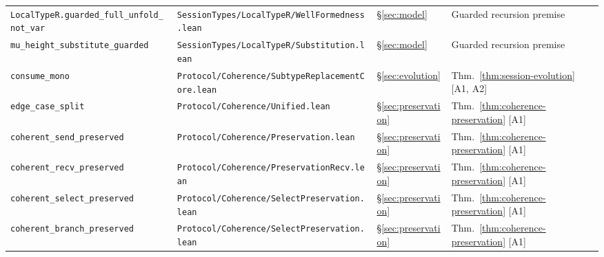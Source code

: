 \documentclass[a4paper,10pt,twocolumn,english]{article}
\numberwithin{equation}{section}
\theoremstyle{paperdef}
\theoremstyle{paperplain}
\theoremstyle{paperdef}
\theoremstyle{paperremark}
\begin{document}
\begin{table}[H]
\begin{tabularx}{\textwidth}{L{0.27\textwidth}L{0.37\textwidth}L{0.06\textwidth}>{\raggedright\arraybackslash}X}
		\texttt{LocalTypeR.\allowbreak guarded\_full\_unfold\_not\_var}           & \texttt{SessionTypes/\allowbreak LocalTypeR/\allowbreak}\mbox{\texttt{WellFormedness.lean}}                                       & \S\ref{sec:model}        & Guarded recursion premise                  \\
		\texttt{mu\_height\_\allowbreak substitute\_guarded}                      & \texttt{SessionTypes/\allowbreak LocalTypeR/\allowbreak}\mbox{\texttt{Substitution.lean}}                                         & \S\ref{sec:model}        & Guarded recursion premise                  \\
		\texttt{consume\_mono}                                                    & \texttt{Protocol/\allowbreak Coherence/\allowbreak}\mbox{\texttt{SubtypeReplacementCore.lean}}                                    & \S\ref{sec:evolution}    & Thm.~\ref{thm:session-evolution} [A1, A2]  \\
		\texttt{edge\_case\_split}                                                & \texttt{Protocol/\allowbreak Coherence/\allowbreak}\mbox{\texttt{Unified.lean}}                                                   & \S\ref{sec:preservation} & Thm.~\ref{thm:coherence-preservation} [A1] \\
		\texttt{coherent\_send\_\allowbreak preserved}                            & \texttt{Protocol/\allowbreak Coherence/\allowbreak}\mbox{\texttt{Preservation.lean}}                                              & \S\ref{sec:preservation} & Thm.~\ref{thm:coherence-preservation} [A1] \\
		\texttt{coherent\_recv\_\allowbreak preserved}                            & \texttt{Protocol/\allowbreak Coherence/\allowbreak}\mbox{\texttt{PreservationRecv.lean}}                                          & \S\ref{sec:preservation} & Thm.~\ref{thm:coherence-preservation} [A1] \\
		\texttt{coherent\_select\_\allowbreak preserved}                          & \texttt{Protocol/\allowbreak Coherence/\allowbreak}\mbox{\texttt{SelectPreservation.lean}}                                        & \S\ref{sec:preservation} & Thm.~\ref{thm:coherence-preservation} [A1] \\
		\texttt{coherent\_branch\_\allowbreak preserved}                          & \texttt{Protocol/\allowbreak Coherence/\allowbreak}\mbox{\texttt{SelectPreservation.lean}}                                        & \S\ref{sec:preservation} & Thm.~\ref{thm:coherence-preservation} [A1] \\

\end{tabularx}
\end{table}
\end{document}
